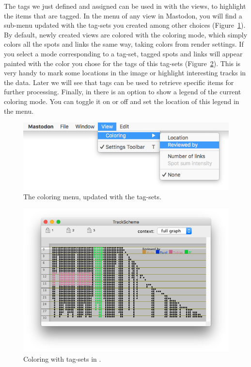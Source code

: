 The tags we just defined and assigned can be used in with the views, to highlight the items that are tagged. 
In the  menu of any view in Mastodon, you will find a sub-menu updated with the tag-sets you created among other choices (Figure~\ref{fig:ColorByTagSetMenu}). 
By default, newly created views are colored with the  coloring mode, which simply colors all the spots and links the same way, taking colors from render settings. 
If you select a mode corresponding to a tag-set, tagged spots and links will appear painted with the color you chose for the tags of this tag-sets (Figure~\ref{fig:ColorByTagSetTrackScheme}).
This is very handy to mark some locations in the image or highlight interesting tracks in the data.
Later we will see that tags can be used to retrieve specific items for further processing.
Finally, in \TrackScheme there is an option to show a legend of the current coloring mode.
You can toggle it on or off and set the location of this legend in the  menu.

\begin{figure}
    \centering
    \includegraphics[height=0.1\textheight]{figures/Mastodon_ColorByTagSet_4.png}
    
    \caption{The coloring menu, updated with the tag-sets. }
    \label{fig:ColorByTagSetMenu}
\end{figure}

\begin{figure}
    \centering
    \includegraphics[height=0.25\textheight]{figures/Mastodon_ColorByTagSet_5.png}
    
    \caption{Coloring with tag-sets in \TrackScheme. }
    \label{fig:ColorByTagSetTrackScheme}
\end{figure}


